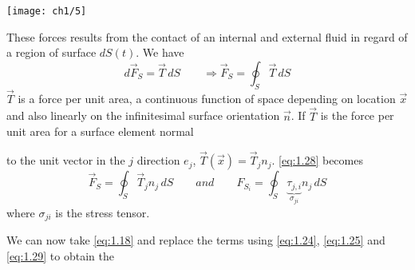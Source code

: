 \begin{itemize}
		\begin{minipage}{0.23\textwidth}
		\texttt{[image: ch1/5]}
		\label{fig:1.5}
		\end{minipage}
		\begin{minipage}{0.7\textwidth}
		These forces results from the contact of an internal and external fluid in regard of a region of surface $dS(t)$. We have 
		\begin{equation}
			d\vec{F}_S = \vec{T}\, dS \qquad \Rightarrow \vec{F}_S = \oint _S \vec{T}\, dS
			\label{eq:1.28}
		\end{equation}
		$\vec{T}$ is a force per unit area, a continuous function of space depending on location $\vec{x}$ and also linearly on the infinitesimal surface orientation $\vec{n}$. If $\vec{T}$ is the force per unit area for a surface element normal
		\end{minipage}
		 to the unit vector in the $j$ direction $e_j$, $\vec{T}(\vec{x}) = \vec{T}_jn_j$. \eqref{eq:1.28} becomes
		 \begin{equation}
		 \vec{F}_S = \oint _S \vec{T}_j n_j \, dS \qquad and \qquad F_{S_i} = \oint _S \underbrace{\tau _{j,i}}_{\sigma _{ji}} n_j\, dS 
		 \label{eq:1.29}
		 \end{equation}
		 where $\sigma _{ji}$ is the stress tensor. 
		\end{itemize}
		We can now take \eqref{eq:1.18} and replace the terms using \eqref{eq:1.24}, \eqref{eq:1.25} and \eqref{eq:1.29} to obtain the 
		
